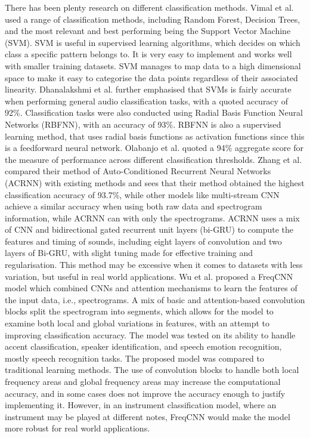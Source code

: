 There has been plenty research on different classification methods. Vimal et al. used a range of classification methods, including Random Forest, Decision Trees, and the most relevant and best performing being the Support Vector Machine (SVM). SVM is useful in supervised learning algorithms, which decides on which class a specific pattern belongs to. It is very easy to implement and works well with smaller training datasets. SVM manages to map data to a high dimensional space to make it easy to categorise the data points regardless of their associated linearity. Dhanalakshmi et al. further emphasised that SVMs is fairly accurate when performing general audio classification tasks, with a quoted accuracy of 92\%. Classification tasks were also conducted using Radial Basis Function Neural Networks (RBFNN), with an accuracy of 93\%. RBFNN is also a supervised learning method, that uses radial basis functions as activation functions since this is a feedforward neural network. Olabanjo et al. quoted a 94\% aggregate score for the measure of performance across different classification thresholds. 
Zhang et al. compared their method of Auto-Conditioned Recurrent Neural Networks (ACRNN) with existing methods and sees that their method obtained the highest classification accuracy of 93.7\%, while other models like multi-stream CNN achieve a similar accuracy when using both raw data and spectrogram information, while ACRNN can with only the spectrograms. ACRNN uses a mix of CNN and bidirectional gated recurrent unit layers (bi-GRU) to compute the features and timing of sounds, including eight layers of convolution and two layers of Bi-GRU, with slight tuning made for effective training and regularisation. This method may be excessive when it comes to datasets with less variation, but useful in real world applications. 
Wu et al. proposed a FreqCNN model which combined CNNs and attention mechanisms to learn the features of the input data, i.e., spectrograms. A mix of basic and attention-based convolution blocks split the spectrogram into segments, which allows for the model to examine both local and global variations in features, with an attempt to improving classification accuracy. The model was tested on its ability to handle accent classification, speaker identification, and speech emotion recognition, mostly speech recognition tasks. The proposed model was compared to traditional learning methods. The use of convolution blocks to handle both local frequency areas and global frequency areas may increase the computational accuracy, and in some cases does not improve the accuracy enough to justify implementing it. However, in an instrument classification model, where an instrument may be played at different notes, FreqCNN would make the model more robust for real world applications. 
